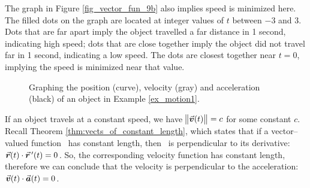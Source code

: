 \begin{example}
\begin{enumerate}
	The graph in Figure \ref{fig_vector_fun_9b} also implies speed is minimized here. The filled dots on the graph are located at integer values of $t$ between $-3$ and 3. Dots that are far apart imply the object travelled a far distance in 1 second, indicating high speed; dots that are close together imply the object did not travel far in 1 second, indicating a low speed. The dots are closest together near $t=0$, implying the speed is minimized near that value.
\end{enumerate}

\begin{figure}[H]
\centering
\centerline{
\hspace{0.1cm}
}
\caption{Graphing the position (curve), velocity (gray) and acceleration (black) of an object in Example \ref{ex_motion1}.}
\end{figure}


\end{example}

If an object travels at a constant speed, we have $\norm{\vvt} = c$ for some constant $c$. Recall Theorem \ref{thm:vects_of_constant_length}, which states that if a vector--valued function \vrt\ has constant length, then \vrt\ is perpendicular to its derivative: $\vrt\cdot\vrp(t) = 0$. So, the corresponding velocity function has constant length, therefore we can conclude that the velocity is perpendicular to the acceleration: $\vvt\cdot\vat = 0$. 


